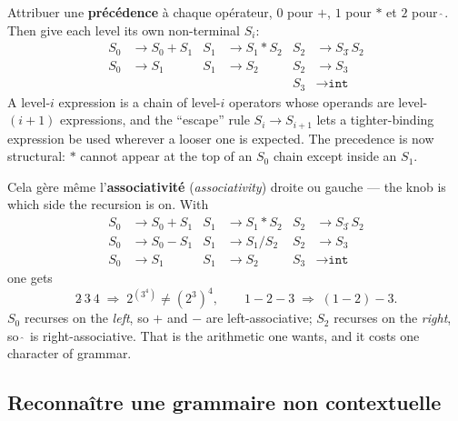 \begin{example}
  Attribuer une \textbf{précédence} à chaque opérateur, $0$ pour $+$, $1$ pour
  $*$ et $2$ pour $\hat{\ }$. Then give each level its own non-terminal
  $S_{i}$:
  \[
    \begin{aligned}
      S_{0} &\to S_{0} + S_{1}   & S_{1} &\to S_{1} * S_{2}          & S_{2} &\to S_{3} \hat{\ } S_{2} \\
      S_{0} &\to S_{1}           & S_{1} &\to S_{2}                  & S_{2} &\to S_{3} \\
            &                    &       &                          & S_{3} &\to \texttt{int}
    \end{aligned}
  \]
  A level-$i$ expression is a chain of level-$i$ operators whose operands are
  level-$(i{+}1)$ expressions, and the ``escape'' rule $S_{i} \to S_{i+1}$ lets
  a tighter-binding expression be used wherever a looser one is expected. The
  precedence is now structural: $*$ cannot appear at the top of an $S_{0}$
  chain except inside an $S_{1}$.
\end{example}

\begin{remark}
  Cela gère même l'\textbf{associativité} (\textit{associativity}) droite ou
  gauche --- the knob is which side the recursion is on. With
  \[
    \begin{aligned}
      S_{0} &\to S_{0} + S_{1} & S_{1} &\to S_{1} * S_{2} & S_{2} &\to S_{3} \hat{\ } S_{2} \\
      S_{0} &\to S_{0} - S_{1} & S_{1} &\to S_{1} / S_{2} & S_{2} &\to S_{3} \\
      S_{0} &\to S_{1}         & S_{1} &\to S_{2}         & S_{3} &\to \texttt{int}
    \end{aligned}
  \]
  one gets
  \[
    2 \hat{\ } 3 \hat{\ } 4 \;\Rightarrow\; 2^{(3^{4})} \neq (2^{3})^{4} ,
    \qquad
    1 - 2 - 3 \;\Rightarrow\; (1-2)-3 .
  \]
  $S_{0}$ recurses on the \emph{left}, so $+$ and $-$ are left-associative;
  $S_{2}$ recurses on the \emph{right}, so $\hat{\ }$ is right-associative.
  That is the arithmetic one wants, and it costs one character of grammar.
\end{remark}

\subsection{Reconnaître une grammaire non contextuelle}

